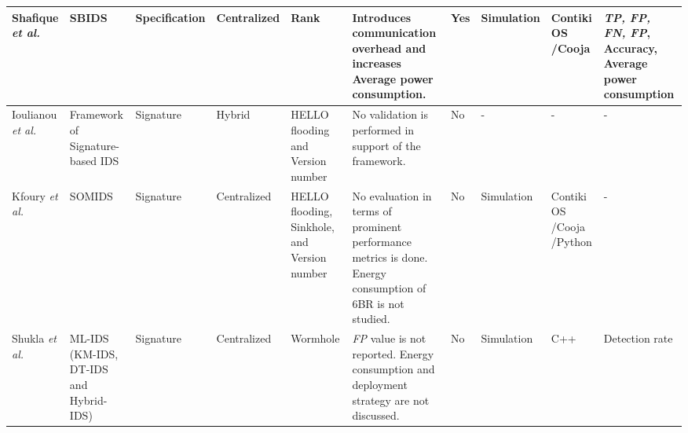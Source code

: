 \documentclass[10pt,journal,sort & compress]{IEEEtran}
\begin{document}
\begin{landscape}
\begin{longtable}{|p{1.8cm}|p{2.2cm}|p{1.45cm}|p{1.4cm}|p{2.3cm}|p{5.5cm}|p{1.15cm}|p{1.3cm}|p{1.7cm}|p{2cm}|}
		Shafique \textit{et al.}\cite{shafique2018detection} & SBIDS & Specification & Centralized & Rank & Introduces communication overhead and increases Average power consumption. & Yes & Simulation & Contiki OS /Cooja & \textit{TP, FP, FN, FP}, Accuracy, Average power consumption\\ \hline
		Ioulianou \textit{et al.}\cite{ioulianou2018signature} & Framework of Signature-based IDS & Signature & Hybrid & HELLO flooding and Version number & No validation is performed in support of the framework. & No & - & - & -\\ \hline
		Kfoury \textit{et al.}\cite{kfoury2019self} & SOMIDS & Signature & Centralized & HELLO flooding, Sinkhole, and Version number & No evaluation in terms of prominent performance metrics is done. Energy consumption of 6BR is not studied. & No & Simulation & Contiki OS /Cooja /Python & - \\ \hline
		Shukla \textit{et al.}\cite{shukla2017ml} & ML-IDS (KM-IDS, DT-IDS and Hybrid-IDS) & Signature & Centralized & Wormhole & \textit{FP} value is not reported.  Energy consumption and deployment strategy are not discussed.   & No & Simulation & C++ & Detection rate\\ \hline
	\end{longtable}
\end{landscape}
\end{document}
